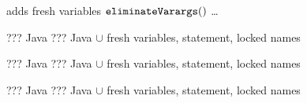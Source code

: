 \begin{algorithm}[p]
\caption{$\refactoring{Introduce Out Parameter}(am \colon \type{AnonymousMethod})$}
\label{alg:IntroduceOutParameter}
\begin{algorithmic}[1]
\REQUIRE
\ENSURE adds fresh variables
\medskip
  \STATE $\text{\texttt{eliminateVarargs}}()$
  \STATE \dots
\end{algorithmic}
\end{algorithm}


\begin{algorithm}[p]
\caption{$\refactoring{Open Variables}(am \colon \type{AnonymousMethod})$}
\label{alg:OpenVariables}
\begin{algorithmic}[1]
\REQUIRE ??? Java
\ENSURE ??? Java $\cup$ fresh variables,  statement, locked names
\medskip
  \STATE
\end{algorithmic}
\end{algorithm}


\begin{algorithm}[p]
\caption{$\refactoring{Inline Anonymous Method}(am \colon \type{AnonymousMethod}) : ASTNode$}
\label{alg:InlineAnonymousMethod}
\begin{algorithmic}[1]
\REQUIRE ??? Java
\ENSURE ??? Java $\cup$ fresh variables,  statement, locked names
\medskip
  \STATE
\end{algorithmic}
\end{algorithm}


\begin{algorithm}[p]
\caption{$\refactoring{Inline Block}(b \colon \type{Block})$}
\label{alg:InlineBlock}
\begin{algorithmic}[1]
\REQUIRE ??? Java
\ENSURE ??? Java $\cup$ fresh variables,  statement, locked names
\medskip
  \STATE
\end{algorithmic}
\end{algorithm}


